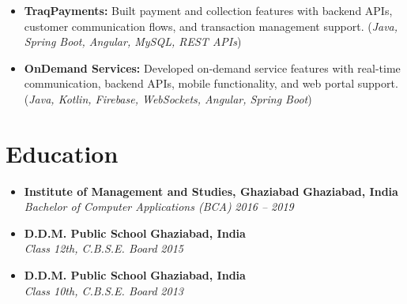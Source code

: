 \documentclass[10pt, a4paper]{article}
\begin{document}
\begin{itemize}[leftmargin=1.5em, itemsep=0.45ex, topsep=0.3ex, label=\textbullet]
\item \textbf{TraqPayments:}
Built payment and collection features with backend APIs, customer communication flows, and transaction management support.
(\textit{Java, Spring Boot, Angular, MySQL, REST APIs})

\item \textbf{OnDemand Services:}
Developed on-demand service features with real-time communication, backend APIs, mobile functionality, and web portal support.
(\textit{Java, Kotlin, Firebase, WebSockets, Angular, Spring Boot})

\end{itemize}

\section*{Education}
\begin{itemize}[leftmargin=0pt, itemsep=0.6ex, topsep=0.3ex]

    \item
    \textbf{Institute of Management and Studies, Ghaziabad} \hfill \textbf{Ghaziabad, India} \\
    \textit{Bachelor of Computer Applications (BCA)} \hfill \textit{2016 -- 2019}

    \item
    \textbf{D.D.M. Public School} \hfill \textbf{Ghaziabad, India} \\
    \textit{Class 12th, C.B.S.E. Board} \hfill \textit{2015}

    \item
    \textbf{D.D.M. Public School} \hfill \textbf{Ghaziabad, India} \\
    \textit{Class 10th, C.B.S.E. Board} \hfill \textit{2013}

\end{itemize}
\end{document}
